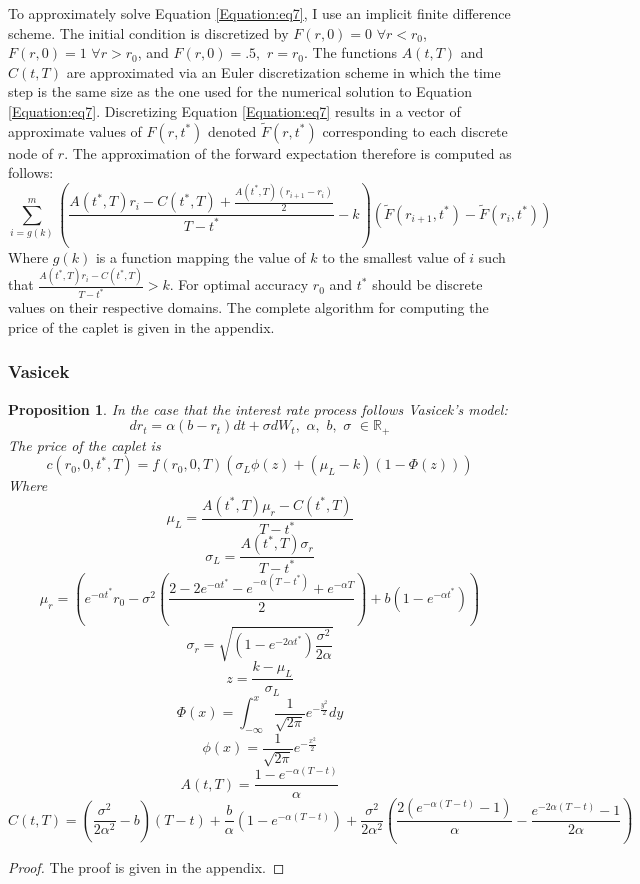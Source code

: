 \documentclass[12pt]{article}
\newtheorem{bond}{Proposition}
\theoremstyle{definition}
\theoremstyle{remark}
\begin{document}
To approximately solve Equation \ref{Equation:eq7}, I use an implicit finite difference scheme.  The initial condition is discretized by \(F(r, 0)=0 \,\, \forall r<r_0\), \(F(r, 0)=1 \,\, \forall r>r_0\), and \(F(r, 0)=.5,\,\, r=r_0\).  The functions  \(A(t, T)\) and \(C(t, T)\) are approximated via an Euler discretization scheme in which the time step is the same size as the one used for the numerical solution to Equation \ref{Equation:eq7}.  Discretizing Equation \ref{Equation:eq7} results in a vector of approximate values of \(F(r, {t^*})\) denoted \(\tilde{F}(r, {t^*})\) corresponding to each discrete node of \(r\).  The approximation of the forward expectation therefore is computed as follows:
\[\sum_ {i=g(k)} ^m \left( \frac{A({t^*}, T)r_i-C({t^*}, T)+\frac{A({t^*}, T)(r_{i+1}-r_{i})}{2}}{T-{t^*}}-k\right)\left(\tilde{F}(r_{i+1}, {t^*})-\tilde{F}(r_{i}, {t^*})\right) \]
Where \(g(k)\) is a function mapping the value of \(k\) to the smallest value of \(i\) such that \(\frac{A({t^*}, T)r_i-C({t^*}, T)}{T-{t^*}} >k\).  For optimal accuracy \(r_0\) and \(t^*\) should be discrete values on their respective domains.  The complete algorithm for computing the price of the caplet is given in the appendix.
\subsubsection{Vasicek}
\begin{bond}
In the case that the interest rate process follows \emph{Vasicek's} model:  \begin{equation} dr_t=\alpha(b-r_t)dt+\sigma dW_t, \,\,\alpha,\,\, b,\,\, \sigma\,\,\in \mathbb{R}_{+} \label{Equation:eq6} \end{equation}
The price of the caplet is
\[c(r_0, 0, {t^*}, T)=f(r_0, 0, T)\left( \sigma_L \phi(z)+  (\mu_L-k)(1-\Phi(z))  \right)\] 
Where
\[\mu_L= \frac{A({t^*}, T) \mu_r -C({t^*}, T)}{T-{t^*}}\]
\[\sigma_L= \frac{A({t^*}, T) \sigma_r}{T-{t^*}}\]
\[\mu _r = \left(e^{-\alpha {t^*}} r_0-\sigma^2\left(\frac{2-2e^{-\alpha {t^*}}-e^{-\alpha(T-{t^*})}+e^{-\alpha 
T} }{2} \right)+ b \left(1-e^{-\alpha {t^*}} \right) \right)\]
\[\sigma_r= \sqrt{\left(1 -e^{-2\alpha {t^*}}\right)\frac{\sigma^2}{2\alpha}}\]
\[z=\frac{k-\mu_L}{\sigma_L}\]
\[\Phi(x)=\int_{-\infty} ^ x \frac{1}{\sqrt{2\pi}}e^{-\frac{y^2}{2}} dy \]
\[\phi(x)=\frac{1}{\sqrt{2\pi}}e^{-\frac{x^2}{2}} \]
\[A(t, T)=\frac{1-e^{-\alpha(T-t)}}{\alpha} \]
\[C(t, T)=\left(\frac{\sigma^2}{2\alpha^2}-b\right)(T-t)+\frac{b}{\alpha}\left(1-e^{-\alpha(T-t)}\right) +\frac{\sigma^2}{2\alpha^2}\left(\frac{2(e^{-\alpha(T-t)}-1)}{\alpha}-\frac{e^{-2\alpha(T-t)}-1}{2\alpha}\right)\]
\label{Proposition: prop5}
\end{bond}
\begin{proof}
The proof is given in the appendix.
\end{proof}
\end{document}
